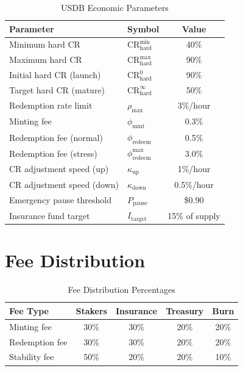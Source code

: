 \documentclass[11pt,a4paper]{article}
\begin{document}
\begin{table}[H]
\centering
\caption{USDB Economic Parameters}
\begin{tabular}{@{}llc@{}}
\toprule
\textbf{Parameter} & \textbf{Symbol} & \textbf{Value} \\ \midrule
Minimum hard CR & $\text{CR}_{\text{hard}}^{\min}$ & 40\% \\
Maximum hard CR & $\text{CR}_{\text{hard}}^{\max}$ & 90\% \\
Initial hard CR (launch) & $\text{CR}_{\text{hard}}^0$ & 90\% \\
Target hard CR (mature) & $\text{CR}_{\text{hard}}^\infty$ & 50\% \\
Redemption rate limit & $\rho_{\max}$ & 3\%/hour \\
Minting fee & $\phi_{\text{mint}}$ & 0.3\% \\
Redemption fee (normal) & $\phi_{\text{redeem}}$ & 0.5\% \\
Redemption fee (stress) & $\phi_{\text{redeem}}^{\max}$ & 3.0\% \\
CR adjustment speed (up) & $\kappa_{\text{up}}$ & 1\%/hour \\
CR adjustment speed (down) & $\kappa_{\text{down}}$ & 0.5\%/hour \\
Emergency pause threshold & $P_{\text{pause}}$ & \$0.90 \\
Insurance fund target & $I_{\text{target}}$ & 15\% of supply \\ \bottomrule
\end{tabular}
\end{table}

\section{Fee Distribution}

\begin{table}[H]
\centering
\caption{Fee Distribution Percentages}
\begin{tabular}{@{}lcccc@{}}
\toprule
\textbf{Fee Type} & \textbf{Stakers} & \textbf{Insurance} & \textbf{Treasury} & \textbf{Burn} \\ \midrule
Minting fee & 30\% & 30\% & 20\% & 20\% \\
Redemption fee & 30\% & 30\% & 20\% & 20\% \\
Stability fee & 50\% & 20\% & 20\% & 10\% \\ \bottomrule
\end{tabular}
\end{table}
\end{document}

